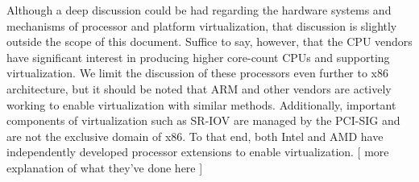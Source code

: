 Although a deep discussion could be had regarding the hardware systems and mechanisms of processor and platform virtualization, that discussion is slightly outside the scope of this document.  Suffice to say, however, that the CPU vendors have significant interest in producing higher core-count CPUs and supporting virtualization.  We limit the discussion of these processors even further to x86 architecture, but it should be noted that ARM and other vendors are actively working to enable virtualization with similar methods.  Additionally, important components of virtualization such as SR-IOV are managed by the PCI-SIG and are not the exclusive domain of x86.  To that end, both Intel and AMD have independently developed processor extensions to enable virtualization.  [ more explanation of what they've done here ]  

